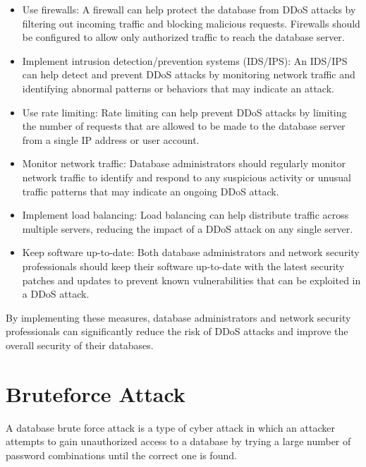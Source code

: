\documentclass[11pt]{article}
\let\oldsection\section
\renewcommand\section{\clearpage\oldsection}
\begin{document}
\begin{itemize}
\item Use firewalls: A firewall can help protect the database from DDoS attacks by filtering out incoming traffic and blocking malicious requests. Firewalls should be configured to allow only authorized traffic to reach the database server.\\

\item Implement intrusion detection/prevention systems (IDS/IPS): An IDS/IPS can help detect and prevent DDoS attacks by monitoring network traffic and identifying abnormal patterns or behaviors that may indicate an attack.\\

\item Use rate limiting: Rate limiting can help prevent DDoS attacks by limiting the number of requests that are allowed to be made to the database server from a single IP address or user account.\\

\item Monitor network traffic: Database administrators should regularly monitor network traffic to identify and respond to any suspicious activity or unusual traffic patterns that may indicate an ongoing DDoS attack.\\

\item Implement load balancing: Load balancing can help distribute traffic across multiple servers, reducing the impact of a DDoS attack on any single server.\\

\item Keep software up-to-date: Both database administrators and network security professionals should keep their software up-to-date with the latest security patches and updates to prevent known vulnerabilities that can be exploited in a DDoS attack.\\
\end{itemize}

By implementing these measures, database administrators and network security professionals can significantly reduce the risk of DDoS attacks and improve the overall security of their databases.\\

\section{Bruteforce Attack}
\label{sec:org68a68dc}

A database brute force attack is a type of cyber attack in which an attacker attempts to gain unauthorized access to a database by trying a large number of password combinations until the correct one is found.\\
\end{document}
